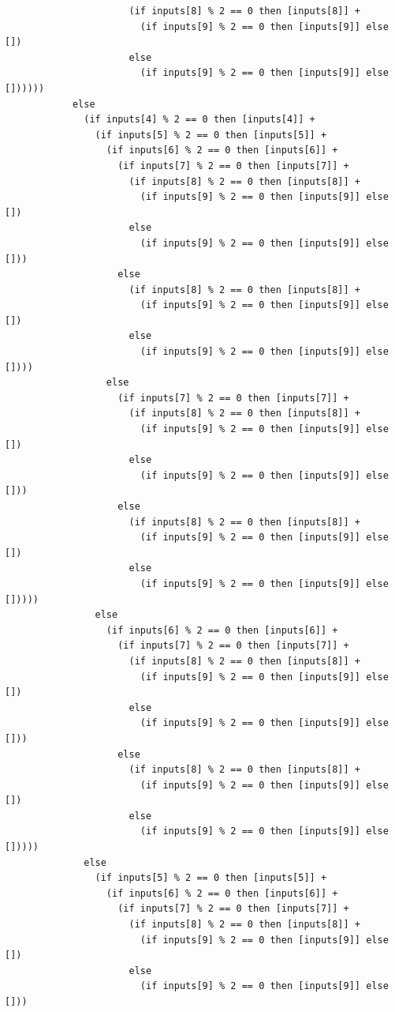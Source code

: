 \documentclass{article}
\begin{document}
\begin{lstlisting}
                      (if inputs[8] % 2 == 0 then [inputs[8]] +
                        (if inputs[9] % 2 == 0 then [inputs[9]] else [])
                      else
                        (if inputs[9] % 2 == 0 then [inputs[9]] else [])))))
            else
              (if inputs[4] % 2 == 0 then [inputs[4]] +
                (if inputs[5] % 2 == 0 then [inputs[5]] +
                  (if inputs[6] % 2 == 0 then [inputs[6]] +
                    (if inputs[7] % 2 == 0 then [inputs[7]] +
                      (if inputs[8] % 2 == 0 then [inputs[8]] +
                        (if inputs[9] % 2 == 0 then [inputs[9]] else [])
                      else
                        (if inputs[9] % 2 == 0 then [inputs[9]] else []))
                    else
                      (if inputs[8] % 2 == 0 then [inputs[8]] +
                        (if inputs[9] % 2 == 0 then [inputs[9]] else [])
                      else
                        (if inputs[9] % 2 == 0 then [inputs[9]] else [])))
                  else
                    (if inputs[7] % 2 == 0 then [inputs[7]] +
                      (if inputs[8] % 2 == 0 then [inputs[8]] +
                        (if inputs[9] % 2 == 0 then [inputs[9]] else [])
                      else
                        (if inputs[9] % 2 == 0 then [inputs[9]] else []))
                    else
                      (if inputs[8] % 2 == 0 then [inputs[8]] +
                        (if inputs[9] % 2 == 0 then [inputs[9]] else [])
                      else
                        (if inputs[9] % 2 == 0 then [inputs[9]] else []))))
                else
                  (if inputs[6] % 2 == 0 then [inputs[6]] +
                    (if inputs[7] % 2 == 0 then [inputs[7]] +
                      (if inputs[8] % 2 == 0 then [inputs[8]] +
                        (if inputs[9] % 2 == 0 then [inputs[9]] else [])
                      else
                        (if inputs[9] % 2 == 0 then [inputs[9]] else []))
                    else
                      (if inputs[8] % 2 == 0 then [inputs[8]] +
                        (if inputs[9] % 2 == 0 then [inputs[9]] else [])
                      else
                        (if inputs[9] % 2 == 0 then [inputs[9]] else []))))
              else
                (if inputs[5] % 2 == 0 then [inputs[5]] +
                  (if inputs[6] % 2 == 0 then [inputs[6]] +
                    (if inputs[7] % 2 == 0 then [inputs[7]] +
                      (if inputs[8] % 2 == 0 then [inputs[8]] +
                        (if inputs[9] % 2 == 0 then [inputs[9]] else [])
                      else
                        (if inputs[9] % 2 == 0 then [inputs[9]] else []))

\end{lstlisting}
\end{document}
